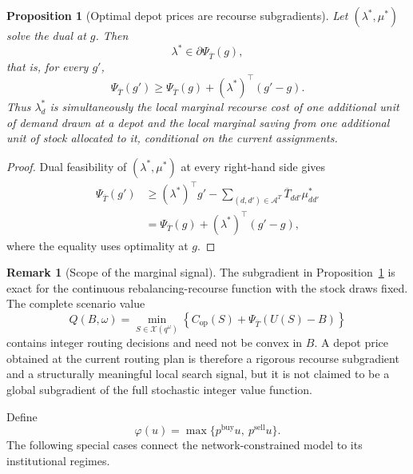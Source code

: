 \documentclass[authoryear,final,3p,times]{elsarticle}
\newtheorem{proposition}{Proposition}
\theoremstyle{definition}
\newtheorem{remark}{Remark}
\theoremstyle{plain}
\begin{document}
\begin{proposition}[Optimal depot prices are recourse subgradients]
\label{prop:recourse_subgradient}
Let $(\lambda^*,\mu^*)$ solve the dual at $g$.  Then
\begin{equation}
\lambda^*\in\partial\Psi_{\overline T}(g),
\label{eq:recourse_subgradient}
\end{equation}
that is, for every $g'$,
\begin{equation}
\Psi_{\overline T}(g')\ge
\Psi_{\overline T}(g)+(\lambda^*)^\top(g'-g).
\label{eq:subgradient_inequality}
\end{equation}
Thus $\lambda_d^*$ is simultaneously the local marginal recourse cost of one
additional unit of demand drawn at a depot and the local marginal saving from
one additional unit of stock allocated to it, conditional on the current
assignments.
\end{proposition}

\begin{proof}
Dual feasibility of $(\lambda^*,\mu^*)$ at every right-hand side gives
\begin{align*}
\Psi_{\overline T}(g')
&\ge (\lambda^*)^\top g'
-\sum_{(d,d')\in\mathcal A^T}\overline T_{dd'}\mu_{dd'}^*\\
&=\Psi_{\overline T}(g)+(\lambda^*)^\top(g'-g),
\end{align*}
where the equality uses optimality at $g$.
\end{proof}

\begin{remark}[Scope of the marginal signal]
\label{rem:local_price_scope}
The subgradient in Proposition~\ref{prop:recourse_subgradient} is exact for the
continuous rebalancing-recourse function with the stock draws fixed.  The
complete scenario value
\begin{equation*}
Q(B,\omega)=\min_{S\in\mathcal X(q^\omega)}
\left\{C_{\mathrm{op}}(S)+\Psi_{\overline T}(U(S)-B)\right\}
\end{equation*}
contains integer routing decisions and need not be convex in $B$.  A depot
price obtained at the current routing plan is therefore a rigorous recourse
subgradient and a structurally meaningful local search signal, but it is not
claimed to be a global subgradient of the full stochastic integer value
function.
\end{remark}

Define
\begin{equation}
\varphi(u)=\max\{p^{\mathrm{buy}}u,\ p^{\mathrm{sell}}u\}.
\label{eq:single_account_settlement}
\end{equation}
The following special cases connect the network-constrained model to its
institutional regimes.
\end{document}
